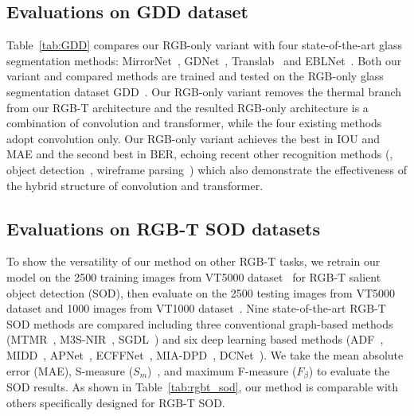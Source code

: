 \subsection{Evaluations on GDD dataset~\cite{mei2020don}}
\label{sec:GDD}
Table~\ref{tab:GDD} compares our RGB-only variant with four state-of-the-art glass segmentation methods: MirrorNet~\cite{yang2019my}, GDNet~\cite{mei2020don}, Translab~\cite{xie2020segmenting} and EBLNet~\cite{He_2021_ICCV}. Both our variant and compared methods are trained and tested on the RGB-only glass segmentation dataset GDD~\cite{mei2020don}. Our RGB-only variant removes the thermal branch from our RGB-T architecture and the resulted RGB-only architecture is a combination of convolution and transformer, while the four existing methods adopt convolution only. 
Our RGB-only variant achieves the best in IOU and MAE and the second best in BER, echoing recent other recognition methods (\eg, object detection~\cite{carion2020end}, wireframe parsing~\cite{xu2021line}) which also demonstrate the effectiveness of the hybrid structure of convolution and transformer.



\subsection{Evaluations on RGB-T SOD datasets}
To show the versatility of our method on other RGB-T tasks, we retrain our model on the 2500 training images from VT5000 dataset~\cite{tu2022rgbtbench} for RGB-T salient object detection (SOD), then evaluate on the 2500 testing images from VT5000 dataset and 1000 images from VT1000 dataset~\cite{tu2019rgb}. Nine state-of-the-art RGB-T SOD methods are compared including three conventional graph-based methods (MTMR~\cite{wang2018rgb}, M3S-NIR~\cite{tu2019m3s}, SGDL~\cite{tu2019rgb}) and six deep learning based methods (ADF~\cite{tu2022rgbtbench}, MIDD~\cite{tu2021multi}, APNet~\cite{zhou2021apnet}, ECFFNet~\cite{zhou2021ecffnet}, MIA-DPD~\cite{liang2022multi}, DCNet~\cite{tu2022weakly}). We take the mean absolute error (MAE), S-measure ($S_m$)~\cite{fan2017structure}, and maximum F-measure ($F_\beta$) to evaluate the SOD results. As shown in Table~\ref{tab:rgbt_sod}, our method is comparable with others specifically designed for RGB-T SOD.




